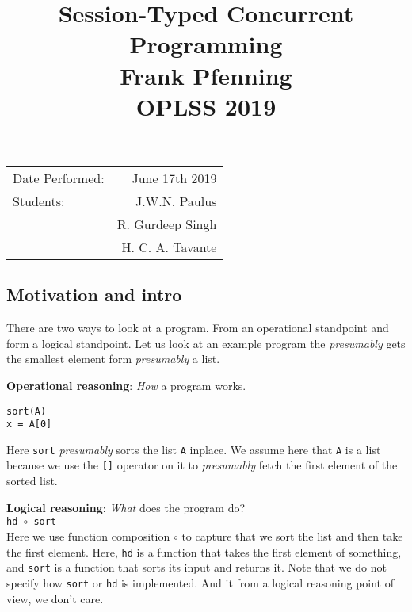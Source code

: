 \documentclass{article}
\title{Session-Typed Concurrent Programming \\ Frank Pfenning \\ OPLSS 2019} %
\begin{document}
\maketitle %

\begin{center}
\begin{tabular}{l r}
Date Performed: & June 17th 2019 \\ %
Students: & J.W.N. Paulus  \\
& R. Gurdeep Singh \\ %
& H. C. A. Tavante 
\end{tabular}
\end{center}





\subsection*{Motivation and intro}

There are two ways to look at a program. From an operational standpoint
and form a logical standpoint. Let us look at an example program the
\emph{presumably} gets the smallest element form \emph{presumably} a
list.

\textbf{Operational reasoning}: \emph{How} a program works.

\begin{verbatim}
sort(A)
x = A[0]
\end{verbatim}

Here \texttt{sort} \emph{presumably} sorts the list \texttt{A} inplace.
We assume here that \texttt{A} is a list because we use the
\texttt{{[}{]}} operator on it to \emph{presumably} fetch the first
element of the sorted list.

\textbf{Logical reasoning}: \emph{What} does the program do?\\

\verb|hd |\(\circ\)\verb| sort| \\

Here we use function composition \(\circ\) to capture that we sort the
list and then take the first element. Here, \texttt{hd} is a function
that takes the first element of something, and \texttt{sort} is a
function that sorts its input and returns it. Note that we do not
specify how \texttt{sort} or \texttt{hd} is implemented. And it from a
logical reasoning point of view, we don't care.
\end{document}
